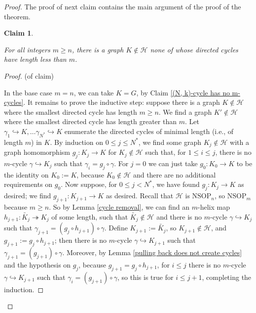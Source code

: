 \documentclass{amsart}
\newtheorem{claim}[theorem]{Claim}
\theoremstyle{definition}
\theoremstyle{remark}
\numberwithin{equation}{section}
\begin{document}
\begin{proof}
The proof of next claim contains the main argument of the proof of the theorem.

\begin{claim}\label{arbitrarily large minimal cycles}

For all integers $m \geq n$, there is a graph $K \notin \mathcal{H}$ none of whose directed cycles have length less than $m$.
    
\end{claim}

\begin{proof}(of claim)

In the base case $m = n$, we can take $K = G$, by Claim \ref{(N, k)-cycle has no m-cycles}. It remains to prove the inductive step: suppose there is a graph $K \notin \mathcal{H}$ where the smallest directed cycle has length $m \geq n$. We find a graph $K' \notin \mathcal{H}$ where the smallest directed cycle has length greater than $m$. Let $\gamma_{1} \hookrightarrow K, \ldots \gamma_{N^{*}} \hookrightarrow K$ enumerate the directed cycles of minimal length (i.e., of length $m$) in $K$. By induction on $0 \leq j \leq N^{*}$, we find some graph $K_{j} \notin \mathcal{H}$ with a graph homomorphism $g_{j}: K_{j} \to K$ for $K_{j} \notin \mathcal{H}$ such that, for $1 \leq i \leq j$, there is no $m$-cycle $\gamma \hookrightarrow K_{j}$ such that $\gamma_{i} = g_{j} \circ \gamma$. For $j = 0$ we can just take $g_{0}: K_{0} \to K$ to be the identity on $K_{0} := K$, because $K_{0} \notin \mathcal{H}$ and there are no additional requirements on $g_{0}$. Now suppose, for $0 \leq j < N^{*}$, we have found $g_{j}: K_{j} \to K$ as desired; we find $g_{j+1}: K_{j+1} \to K$ as desired. Recall that $\mathcal{H}$ is $\mathrm{NSOP}_{n}$, so $\mathrm{NSOP}_{m}$ because $m \geq n$. So by Lemma \ref{cycle removal}, we can find an $m$-helix map $h_{j+1}: \tilde{K_{j}} \twoheadrightarrow K_{j}$ of some length, such that $\tilde{K_{j}} \notin \mathcal{H}$ and there is no $m$-cycle $\gamma \hookrightarrow K_{j}$ such that $\gamma_{j+1} = (g_{j} \circ h_{j+1}) \circ \gamma$. Define $K_{j+1}:= \tilde{K_{j}}$, so $K_{j+1} \notin \mathcal{H}$, and $g_{j+1}:= g_{j} \circ h_{j+1} $; then there is no $m$-cycle $\gamma \hookrightarrow K_{j+1}$ such that $\gamma_{j+1} = (g_{j+1} ) \circ \gamma$. Moreover, by Lemma \ref{pulling back does not create cycles} and the hypothesis on $g_{j}$, because $g_{j+1}= g_{j} \circ h_{j+1} $, for $i \leq j$ there is no $m$-cycle $\gamma \hookrightarrow K_{j+1}$ such that $\gamma_{i} = (g_{j+1} ) \circ \gamma$, so this is true for $i \leq j+1$, completing the induction.


\end{proof}
\end{proof}
\end{document}
